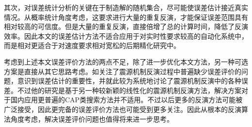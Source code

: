 其次，对误差统计分析的关键在于制造解的随机集合，尽可能使误差估计接近真实情况。从概率统计角度考虑，这要求进行大量的重复反演，才能保证误差范围具有相对较高的可信度。但是大量的重复反演，直接倍增了总的计算时间，降低了反演效率。因此本文的误差估计方法不适合应用于对实时性要求较高的自动化系统中，而是相对更适合于对速度要求相对宽松的后期精化研究中。

考虑到上述本文误差评价方法的两点不足，除了进一步优化本文方法，另一种可选方案是直接从其它思路考虑。如\citet{Duputel2012}关注了震源机制反演过程中普遍缺少误差评价的问题，意识到误差估计的重要性，并就此较为系统地讨论了震源机制反演中的各种误差。不过他的研究是基于另一种较新颖的线性化的震源机制反演方法，解决方案对于国内应用更普遍的CAP类搜索方法并不适用。不过以后更多的反演方法可能被广泛接受，因此更完备的误差评价方法也可能受到更多关注。因此从根本的反演算法角度考虑，解决误差评价问题也值得将来进一步思考。
